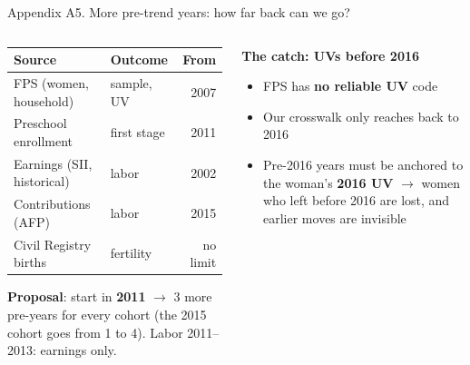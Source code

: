 \documentclass[aspectratio=169,10pt]{beamer}
\newcommand{\takeaway}[1]{\par\vspace{6pt}{\small\textcolor{steel}{$\Rightarrow$}\ \textbf{\textcolor{navy}{#1}}}}
\begin{document}
\begin{frame}{Appendix A5. More pre-trend years: how far back can we go?}
\begin{columns}[T]
\begin{column}{0.54\textwidth}
\begin{center}
\footnotesize
\begin{tabular}{@{}llr@{}}
\toprule
Source & Outcome & From \\
\midrule
FPS (women, household) & sample, UV & 2007 \\
Preschool enrollment & first stage & 2011 \\
Earnings (SII, historical) & labor & 2002 \\
Contributions (AFP) & labor & 2015 \\
Civil Registry births & fertility & no limit \\
\bottomrule
\end{tabular}
\end{center}
\vspace{2pt}
{\footnotesize \textbf{Proposal}: start in \textbf{2011} $\to$ 3 more pre-years for every cohort (the 2015 cohort goes from 1 to 4). Labor 2011--2013: earnings only.}
\end{column}
\begin{column}{0.42\textwidth}
\colorbox{bgpanel}{\parbox{0.95\linewidth}{\raggedright\footnotesize
\textbf{The catch: UVs before 2016}
\begin{itemize}
  \footnotesize
  \item FPS has \textbf{no reliable UV} code
  \item Our crosswalk only reaches back to 2016
  \item Pre-2016 years must be anchored to the woman's \textbf{2016 UV} $\to$ women who left before 2016 are lost, and earlier moves are invisible
\end{itemize}}}
\end{column}
\end{columns}
\takeaway{Data exist back to 2011 for all outcomes, but UVs before 2016 have to be proxied by the 2016 UV.}
\end{frame}
\end{document}
